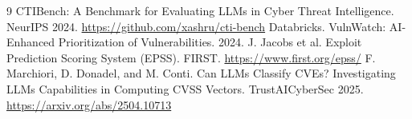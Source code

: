 \documentclass[10pt,twocolumn]{article}
\begin{document}
\begin{thebibliography}{9}\small
{} CTIBench: A Benchmark for Evaluating LLMs in Cyber Threat
Intelligence. NeurIPS 2024. \url{https://github.com/xashru/cti-bench}
 Databricks. VulnWatch: AI-Enhanced Prioritization of
Vulnerabilities. 2024.
 J. Jacobs et al. Exploit Prediction Scoring System (EPSS). FIRST.
\url{https://www.first.org/epss/}
 F. Marchiori, D. Donadel, and M. Conti. Can LLMs Classify
CVEs? Investigating LLMs Capabilities in Computing CVSS Vectors.
TrustAICyberSec 2025. \url{https://arxiv.org/abs/2504.10713}
\end{thebibliography}
\end{document}
